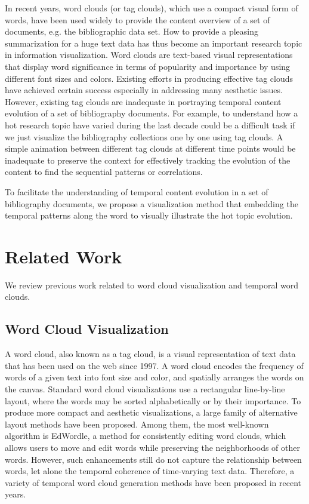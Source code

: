 \documentclass[12pt]{iopart}
\begin{document}
In recent years, word clouds (or tag clouds), which use a compact visual form of words, have been used widely to provide the content overview of a set of documents, e.g. the bibliographic data set. How to provide a pleasing summarization for a huge text data has thus become an important research topic in information visualization. Word clouds are text-based visual representations that display word significance in terms of popularity and importance by using different font sizes and colors. Existing efforts in producing effective tag clouds have achieved certain success especially in addressing many aesthetic issues. However, existing tag clouds are inadequate in portraying temporal content evolution of a set of bibliography documents. For example, to understand how a hot research topic have varied during the last decade could be a difficult task if we just visualize the bibliography collections one by one using tag clouds. A simple animation between different tag clouds at different time points would be inadequate to preserve the context for effectively tracking the evolution of the content to find the sequential patterns or correlations.

To facilitate the understanding of temporal content evolution in a set of bibliography documents, we propose a visualization method that embedding the temporal patterns along the word to visually illustrate the hot topic evolution.

\section{Related Work}

We review previous work related to word cloud visualization and temporal word clouds.

\subsection{Word Cloud Visualization}

A word cloud, also known as a tag cloud, is a visual representation of text data that has been used on the web since 1997\cite{Viegas:2008ew}. A word cloud encodes the frequency of words of a given text into font size and color\cite{Rivadeneira:2007ge}, and spatially arranges the words on the canvas. Standard word cloud visualizations use a rectangular line-by-line layout, where the words may be sorted alphabetically or by their importance. To produce more compact and aesthetic visualizations, a large family of alternative layout methods have been proposed\cite{LocarekJunge:2010cy, kaser2007tag, Seifert:ha, Strobelt:2012co, Viegas:km, Wang:2018ji}. Among them, the most well-known algorithm is EdWordle\cite{Wang:2018ji}, a method for consistently editing word clouds, which allows users to move and edit words while preserving the neighborhoods of other words. However, such enhancements still do not capture the relationship between words, let alone the temporal coherence of time-varying text data. Therefore, a variety of temporal word cloud generation methods have been proposed in recent years.
\end{document}
